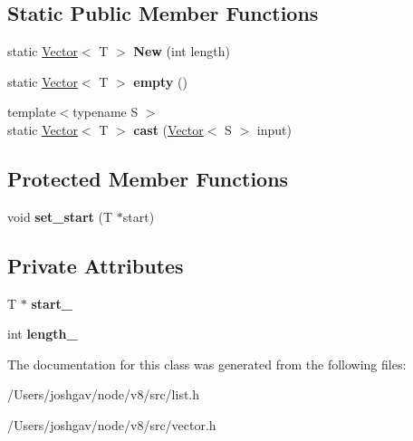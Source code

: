 \subsection*{Static Public Member Functions}
\begin{DoxyCompactItemize}
\item 
static \hyperlink{classv8_1_1internal_1_1_vector}{Vector}$<$ T $>$ {\bfseries New} (int length)\hypertarget{classv8_1_1internal_1_1_vector_adb4189b3dc89e2c2dfd532c5615ead33}{}\label{classv8_1_1internal_1_1_vector_adb4189b3dc89e2c2dfd532c5615ead33}

\item 
static \hyperlink{classv8_1_1internal_1_1_vector}{Vector}$<$ T $>$ {\bfseries empty} ()\hypertarget{classv8_1_1internal_1_1_vector_a5a178ac96e3a64e7f2addc3b201285fd}{}\label{classv8_1_1internal_1_1_vector_a5a178ac96e3a64e7f2addc3b201285fd}

\item 
{\footnotesize template$<$typename S $>$ }\\static \hyperlink{classv8_1_1internal_1_1_vector}{Vector}$<$ T $>$ {\bfseries cast} (\hyperlink{classv8_1_1internal_1_1_vector}{Vector}$<$ S $>$ input)\hypertarget{classv8_1_1internal_1_1_vector_a12baedd3e605f40b24f28f3d05716a23}{}\label{classv8_1_1internal_1_1_vector_a12baedd3e605f40b24f28f3d05716a23}

\end{DoxyCompactItemize}
\subsection*{Protected Member Functions}
\begin{DoxyCompactItemize}
\item 
void {\bfseries set\+\_\+start} (T $\ast$start)\hypertarget{classv8_1_1internal_1_1_vector_a9da3046624f3492e444896bcd1b5225f}{}\label{classv8_1_1internal_1_1_vector_a9da3046624f3492e444896bcd1b5225f}

\end{DoxyCompactItemize}
\subsection*{Private Attributes}
\begin{DoxyCompactItemize}
\item 
T $\ast$ {\bfseries start\+\_\+}\hypertarget{classv8_1_1internal_1_1_vector_a959351a787733a4e284d0e9e1e1e0ba1}{}\label{classv8_1_1internal_1_1_vector_a959351a787733a4e284d0e9e1e1e0ba1}

\item 
int {\bfseries length\+\_\+}\hypertarget{classv8_1_1internal_1_1_vector_ac90f36ff8dec728d8f75e9870edff298}{}\label{classv8_1_1internal_1_1_vector_ac90f36ff8dec728d8f75e9870edff298}

\end{DoxyCompactItemize}


The documentation for this class was generated from the following files\+:\begin{DoxyCompactItemize}
\item 
/\+Users/joshgav/node/v8/src/list.\+h\item 
/\+Users/joshgav/node/v8/src/vector.\+h\end{DoxyCompactItemize}
